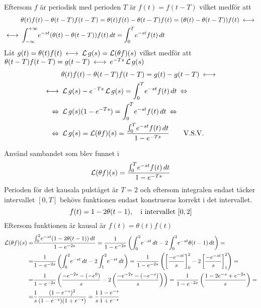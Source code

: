 \begin{task}{3.14}
	Eftersom $f$ är periodisk med perioden $T$ är $f(t)=f(t-T)$ vilket medför att
	\begin{align*}
	&\theta(t)f(t)-\theta(t-T)f(t-T)=
	\theta(t)f(t)-\theta(t-T)f(t)=
	(\theta(t)-\theta(t-T))f(t)\llra \\ \llra
	&\int_{-\infty}^{+\infty}\! e^{-st}(\theta(t)-\theta(t-T))f(t)\, dt=
	\int_{0}^{T}\! e^{-st}f(t)\, dt
	\end{align*}
	Låt $g(t)=\theta(t)f(t)\llra \laplace g(s)=\laplace (\theta f)(s)$ vilket medför att \\
	$\theta(t-T)f(t-T)=g(t-T)\llra e^{-Ts}\laplace g(s)$
	\begin{align*}
	&\theta(t)f(t)-\theta(t-T)f(t-T)=
	g(t)-g(t-T)\llra \\ \llra
	&\laplace g(s)-e^{-Ts}\laplace g(s)=
	\int_{0}^{T}\! e^{-st}f(t)\, dt \lra \\ \lra
	&\laplace g(s)(1-e^{-Ts})=
	\int_{0}^{T}\! e^{-st}f(t)\, dt \lra \\ \lra
	&\laplace g(s)=\laplace(\theta f)(s)=
	\frac{\int_{0}^{T}\! e^{-st}f(t)\, dt}{1-e^{-Ts}} \mproof
	\end{align*}
\end{task}

\pagebreak
\begin{task}{3.15}
	Använd sambandet som blev funnet i 
	\[\operatorname{\mathcal{L}}(\theta f)(s)=\frac{\int_{0}^{T}\! e^{-st}f(t)\, dt}{1-e^{-Ts}}\]
	Perioden för det kausala pulståget är $T=2$ och eftersom integralen endast täcker intervallet $[0, T]$ behövs funktionen endast konstrueras korrekt i det intervallet.
	\[f(t)=1-2\theta(t-1), \quad \text{i intervallet }[0,2]\]
	Eftersom funktionen är kausal är $f(t) = \theta(t)f(t)$
	\begin{align*}
	\laplace(\theta f)(s)=
	&\frac{\int_{0}^{2}\! e^{-st}(1-2\theta(t-1))\, dt}{1-e^{-2s}}=
	\frac{1}{1-e^{-2s}}\left(\int_{0}^{2}\! e^{-st}\, dt-2\int_{0}^{2}\! e^{-st}\theta(t-1)\, dt\right)= \\ =
	&\frac{1}{1-e^{-2s}}\left(\int_{0}^{2}\! e^{-st}\, dt-2\int_{1}^{2}\! e^{-st}\, dt\right)=
	\frac{1}{1-e^{-2s}}\left(\left[\frac{-e^{-st}}{s}\right]_0^2-2\left[\frac{-e^{-st}}{s}\right]_1^2\right)= \\ =
	&\frac{1}{1-e^{-2s}}\left(\frac{-e^{-2s}-(-e^{0})}{s}-2\left(\frac{-e^{-2s}-(-e^{-s})}{s}\right)\right)=
	\frac{1}{1-e^{-2s}}\left(\frac{1-2e^{-s}+e^{-2s}}{s}\right)= \\ =
	&\frac{1}{s}\*\frac{(1-e^{-s})^2}{(1-e^{-s})(1+e^{-s})}=
	\frac{1}{s}\*\frac{1-e^{-s}}{1+e^{-s}}
	\end{align*}
\end{task}

